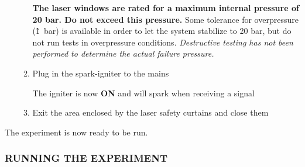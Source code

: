 \begin{enumerate}
\begin{enumerate}

    \warningsymbol \textbf{The
    laser windows are rated for a maximum internal pressure of 20 bar.
    Do not exceed this
    pressure.}
    Some tolerance for overpressure (\~1~bar) is available
    in order to let the system stabilize to 20 bar, but do not run tests
    in overpressure conditions. \emph{Destructive testing has not been
    performed to determine the actual failure pressure.}
  \item
    Plug in the spark-igniter to the mains

    \warningsymbol The igniter is now \textbf{ON} and will spark when receiving a
    signal
  \item
    Exit the area enclosed by the laser safety curtains and close them
  \end{enumerate}
\end{enumerate}

The experiment is now ready to be run.

\subsubsection{RUNNING THE EXPERIMENT}\label{running-the-experiment}

